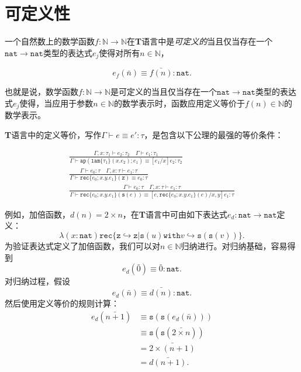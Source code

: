 \section{可定义性}

一个自然数上的数学函数$f:\mathbb{N}\to\mathbb{N}$在\textbf{T}语言中是\textit{可定义的}当且仅当存在一个$\mathtt{nat}\to\mathtt{nat}$类型的表达式$e_j$使得对所有$n\in\mathbb{N}$，

\begin{equation}
e_f(\bar{n})\equiv\bar{f(n)}:\mathtt{nat}.
\end{equation}

也就是说，数学函数$f:\mathbb{N}\to\mathbb{N}$是可定义的当且仅当存在一个$\mathtt{nat}\to\mathtt{nat}$类型的表达式$e_j$使得，当应用于参数$n\in\mathbb{N}$的数学表示时，函数应用定义等价于$f(n)\in\mathbb{N}$的数学表示。

\textbf{T}语言中的定义等价，写作$\Gamma\vdash e\equiv e':\tau$，是包含以下公理的最强的等价条件：

\begin{subequations}
\begin{gather}
\frac{\Gamma,x:\tau_1\vdash e_2:\tau_2\quad\Gamma\vdash e_1:\tau_1}{\Gamma\vdash\mathtt{ap}(\mathtt{lam}\{\tau_1\}(x.e_2);e_1)\equiv[e_1/x]e_2:\tau_2}\\
\frac{\Gamma\vdash e_0:\tau\quad\Gamma,x:\tau\vdash e_1:\tau}{\Gamma\vdash\mathtt{rec}\{e_0;x.y.e_1\}(\mathtt{z})\equiv e_0:\tau}\\
\frac{\Gamma\vdash e_0:\tau\quad\Gamma,x:\tau\vdash e_1:\tau}{\Gamma\vdash\mathtt{rec}\{e_0;x.y.e_1\}(\mathtt{s}(e))\equiv[e,\mathtt{rec}\{e_0;x.y.e_1\}(e)/x,y]e_1:\tau}
\end{gather}
\end{subequations}

例如，加倍函数，$d(n)=2\times n$，在\textbf{T}语言中可由如下表达式$e_d:\mathtt{nat}\to\mathtt{nat}$定义：
\begin{equation*}
\lambda(x:\mathtt{nat})\mathtt{rec}\{\mathtt{z}\hookrightarrow\mathtt{z}|\mathtt{s}(u)\mathtt{with}v\hookrightarrow\mathtt{s}(\mathtt{s}(v))\}.
\end{equation*}
为验证表达式定义了加倍函数，我们可以对$n\in\mathbb{N}$归纳进行。对归纳基础，容易得到
\begin{equation*}
e_d(\bar{0})\equiv\bar{0}:\mathtt{nat}.
\end{equation*}
对归纳过程，假设
\begin{equation*}
e_d(\bar{n})\equiv\bar{d(n)}:\mathtt{nat}.
\end{equation*}
然后使用定义等价的规则计算：
$$
\begin{array}{ll}
e_d(\bar{n+1})  &\equiv\mathtt{s}(\mathtt{s}(e_d(\bar{n})))\\
                &\equiv\mathtt{s}(\mathtt{s}(\bar{2\times n}))\\
                &=\bar{2\times(n+1)}\\
                &=\bar{d(n+1)}.
\end{array}
$$

